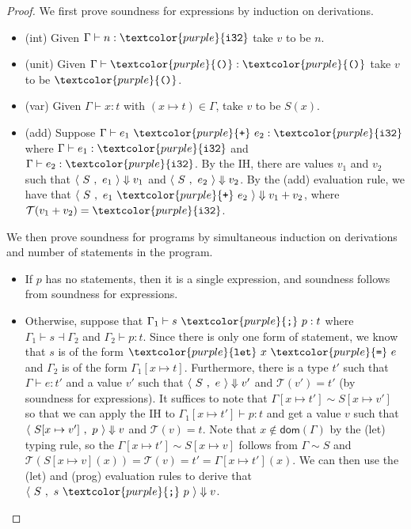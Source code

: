 \documentclass[10pt]{article}
\newcommand{\code}[1]{\textcolor{purple}{\textnormal{\texttt{#1}}}}
\begin{document}
\begin{proof}
  We first prove soundness for expressions by induction on derivations.
  \begin{itemize}
  \item (int) Given $\Gamma \vdash n : \code{i32}$ take $v$ to be $n$.
  \item (unit) Given $\Gamma \vdash \code{()} : \code{()}$ take $v$ to be $\code{()}$.
  \item (var) Given $\Gamma \vdash x : t$ with $(x \mapsto t) \in \Gamma$, take $v$ to be $S(x)$.
  \item (add) Suppose $\Gamma \vdash e_1 \ \code{+} \ e_2 : \code{i32}$
    where $\Gamma \vdash e_1 : \code{i32}$ and $\Gamma \vdash e_2 :
    \code{i32}$. By the IH, there are values $v_1$ and $v_2$ such that
    $\langle \ S \ , \ e_1 \ \rangle \Downarrow v_1$ and $\langle \ S \ , \ e_2 \ \rangle \Downarrow
    v_2$. By the (add) evaluation rule, we have that $\config S {e_1 \ \code{+} \ e_2} \Downarrow {v_1 + v_2}$, where $\mathcal T(v_1 + v_2) = \code{i32}$.
  \end{itemize}
  We then prove soundness for programs by simultaneous induction on derivations and number of statements in the program.
  \begin{itemize}
  \item If $p$ has no statements, then it is a single expression, and soundness follows from soundness for expressions.
  \item Otherwise, suppose that $\Gamma_1 \vdash s \ \code ; \ p : t$ where $\Gamma_1 \vdash s \dashv \Gamma_2$ and $\Gamma_2 \vdash p : t$.
    Since there is only one form of statement, we know that $s$ is of the form $\code{let} \ x \ \code = \ e$ and $\Gamma_2$ is of the form $\Gamma_1[x \mapsto t]$.
    Furthermore, there is a type $t'$ such that $\Gamma \vdash e : t'$ and a value $v'$ such that $\langle \ S \ , \ e \ \rangle \Downarrow v'$ and $\mathcal T(v') = t'$ (by soundness for expressions).
    It suffices to note that $\Gamma[x \mapsto t'] \sim S[x \mapsto v']$ so that we can apply the IH to $\Gamma_1[x \mapsto t'] \vdash p : t$ and get a value $v$ such that $\langle \ S[x \mapsto v'] \ , \ p \ \rangle \Downarrow v$ and $\mathcal T(v) = t$.
    Note that $x \not \in \mathsf{dom}(\Gamma)$ by the (let) typing rule, so the $\Gamma[x \mapsto t'] \sim S[x \mapsto v]$ follows from $\Gamma \sim S$ and $\mathcal T(S[x \mapsto v](x)) = \mathcal T(v) = t' = \Gamma[x \mapsto t'](x)$.
    We can then use the (let) and (prog) evaluation rules to derive that $\config S {s \ \code ; \ p} \Downarrow v$.
  \end{itemize}
\end{proof}
\end{document}
